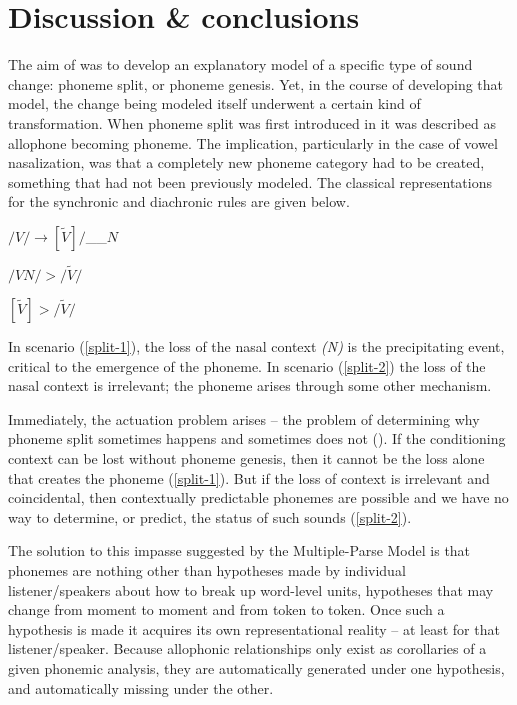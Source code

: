 \chapter{Discussion \& conclusions}\label{ch:Summary}

The aim of  was to develop an explanatory
model of a specific type of sound change: phoneme split, or phoneme
genesis. Yet, in the course of developing that model, the change being
modeled itself underwent a certain kind of transformation. When phoneme
split was first introduced in  it was
described as allophone becoming phoneme. The implication, particularly
in the case of vowel nasalization, was that a completely new phoneme
category had to be created, something that had not been previously
modeled. The classical representations for the synchronic and diachronic
rules are given below.
\begin{covexample}
\label{allophonic rule}$/V/\rightarrow[\tilde{V}]/$\_\_$N$
\end{covexample}
\begin{covsubexamples}
\item \label{split-1}$/VN/>/\tilde{V}/$
\item \label{split-2}$[\tilde{V}]>/\tilde{V}/$
\end{covsubexamples}
In scenario (\ref{split-1}), the loss of the nasal context \emph{(N)}
is the precipitating event, critical to the emergence of the phoneme.
In scenario (\ref{split-2}) the loss of the nasal context is irrelevant;
the phoneme arises through some other mechanism.

Immediately, the actuation problem arises – the problem of determining
why phoneme split sometimes happens and sometimes does not (\citealt{Labov1968}).
If the conditioning context can be lost without phoneme genesis, then
it cannot be the loss alone that creates the phoneme (\ref{split-1}).
But if the loss of context is irrelevant and coincidental, then contextually
predictable phonemes are possible and we have no way to determine, or predict, the status of such sounds (\ref{split-2}).

The solution to this impasse suggested by the Multiple-Parse
Model is that phonemes are nothing other than hypotheses made by individual
listener/speakers about how to break up word-level units, hypotheses
that may change from moment to moment and from token to token. Once
such a hypothesis is made it acquires its own representational reality
– at least for that listener/speaker. Because allophonic relationships only
exist as corollaries of a given phonemic analysis, they are automatically
generated under one hypothesis, and automatically missing under the
other. 


